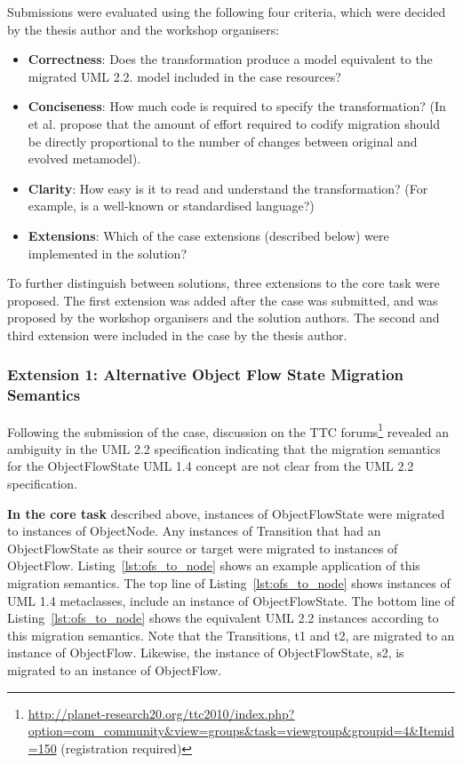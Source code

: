 Submissions were evaluated using the following four criteria, which were decided by the thesis author and the workshop organisers:

\begin{itemize}
	\item \textbf{Correctness}: Does the transformation produce a model equivalent to the migrated UML 2.2. model included in the case resources?
	\item \textbf{Conciseness}: How much code is required to specify the transformation? (In \cite{sprinkle04domain} et al. propose that the amount of effort required to codify migration should be directly proportional to the number of changes between original and evolved metamodel).
		\item \textbf{Clarity}: How easy is it to read and understand the transformation? (For example, is a well-known or standardised language?)
		\item \textbf{Extensions}: Which of the case extensions (described below) were implemented in the solution?
\end{itemize}

To further distinguish between solutions, three extensions to the core task were proposed. The first extension was added after the case was submitted, and was proposed by the workshop organisers and the solution authors. The second and third extension were included in the case by the thesis author. 

\subsubsection{Extension 1: Alternative Object Flow State Migration Semantics}
\label{sub:object_flow_states}
Following the submission of the case, discussion on the TTC forums\footnote{\url{http://planet-research20.org/ttc2010/index.php?option=com_community&view=groups&task=viewgroup&groupid=4&Itemid=150} (registration required)} revealed an ambiguity in the UML 2.2 specification indicating that the migration semantics for the ObjectFlowState UML 1.4 concept are not clear from the UML 2.2 specification.

\textbf{In the core task} described above, instances of ObjectFlowState were migrated to instances of ObjectNode. Any instances of Transition that had an ObjectFlowState as their source or target were migrated to instances of ObjectFlow. Listing~\ref{lst:ofs_to_node} shows an example application of this migration semantics. The top line of Listing~\ref{lst:ofs_to_node} shows instances of UML 1.4 metaclasses, include an instance of ObjectFlowState. The bottom line of Listing~\ref{lst:ofs_to_node} shows the equivalent UML 2.2 instances according to this migration semantics. Note that the Transitions, t1 and t2, are migrated to an instance of ObjectFlow. Likewise, the instance of ObjectFlowState, s2, is migrated to an instance of ObjectFlow.

